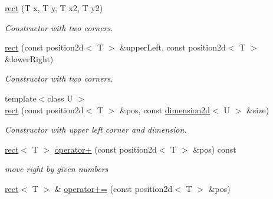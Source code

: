 \begin{DoxyCompactItemize}
\mbox{\label{classirr_1_1core_1_1rect_af7d59f53cd24d5f9f587896160ece50a}} 
\hyperlink{classirr_1_1core_1_1rect_af7d59f53cd24d5f9f587896160ece50a}{rect} (T x, T y, T x2, T y2)
\begin{DoxyCompactList}\small\item\em Constructor with two corners. \end{DoxyCompactList}\item 
\mbox{\label{classirr_1_1core_1_1rect_a8f207109cebad893de44b01cc67e9e34}} 
\hyperlink{classirr_1_1core_1_1rect_a8f207109cebad893de44b01cc67e9e34}{rect} (const position2d$<$ T $>$ \&upper\+Left, const position2d$<$ T $>$ \&lower\+Right)
\begin{DoxyCompactList}\small\item\em Constructor with two corners. \end{DoxyCompactList}\item 
\mbox{\label{classirr_1_1core_1_1rect_a54526b73a11cf90a4f4ff0c6d1556fcc}} 
{\footnotesize template$<$class U $>$ }\\\hyperlink{classirr_1_1core_1_1rect_a54526b73a11cf90a4f4ff0c6d1556fcc}{rect} (const position2d$<$ T $>$ \&pos, const \hyperlink{classirr_1_1core_1_1dimension2d}{dimension2d}$<$ U $>$ \&size)
\begin{DoxyCompactList}\small\item\em Constructor with upper left corner and dimension. \end{DoxyCompactList}\item 
\mbox{\label{classirr_1_1core_1_1rect_ac6afa4c2102eb30bbb0cbd0615a9b533}} 
\hyperlink{classirr_1_1core_1_1rect}{rect}$<$ T $>$ \hyperlink{classirr_1_1core_1_1rect_ac6afa4c2102eb30bbb0cbd0615a9b533}{operator+} (const position2d$<$ T $>$ \&pos) const
\begin{DoxyCompactList}\small\item\em move right by given numbers \end{DoxyCompactList}\item 
\mbox{\label{classirr_1_1core_1_1rect_a4f4f1c3c3321d1ca5e9f617ebf47421c}} 
\hyperlink{classirr_1_1core_1_1rect}{rect}$<$ T $>$ \& \hyperlink{classirr_1_1core_1_1rect_a4f4f1c3c3321d1ca5e9f617ebf47421c}{operator+=} (const position2d$<$ T $>$ \&pos)

\end{DoxyCompactItemize}
